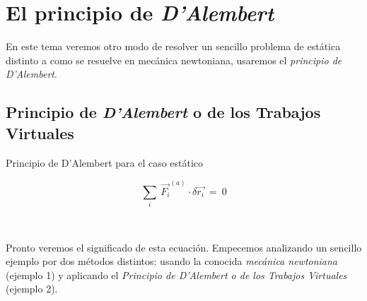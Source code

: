 \chapter{El principio de \emph{D'Alembert}}




\vspace{1cm}

\begin{adjustwidth}{50pt}{50pt}
\begin{ejemplo}
	En este tema veremos otro modo de resolver un sencillo problema de estática distinto a como se resuelve en mecánica newtoniana, usaremos el \emph{principio de D'Alembert}.	
\end{ejemplo}
\end{adjustwidth}
	
\vspace{1cm}
	
\section{Principio de \emph{D'Alembert} o de los Trabajos Virtuales}\label{T1PTV}

\vspace{0.5cm}

\begin{myblock}{Principio de D'Alembert para el caso estático}
$\,$

\begin{Large}
\begin{equation}
\label{DA}
 \displaystyle \sum_i \ \overrightarrow{F_i}^{(a)} \cdot \delta \overrightarrow{r_i}	 \ = \ 0
\end{equation}
\end{Large}
$\,$
\end{myblock}

\vspace{1cm}
\normalsize{Pronto} veremos el significado de esta ecuación. Empecemos analizando un sencillo ejemplo por dos métodos distintos: usando la conocida \emph{mecánica newtoniana} (ejemplo 1) y aplicando el \emph{Principio de D'Alembert o de los Trabajos Virtuales} (ejemplo 2).

\vspace{1cm}

